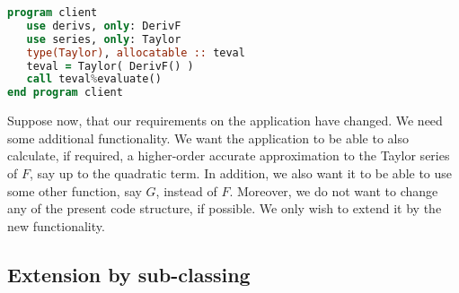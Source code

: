\documentclass[11pt,oneside]{article}
\begin{document}
\newpage

\begin{lstlisting}[language=Fortran]
program client
   use derivs, only: DerivF
   use series, only: Taylor
   type(Taylor), allocatable :: teval
   teval = Taylor( DerivF() )   
   call teval%evaluate()   
end program client
\end{lstlisting}

Suppose now, that our requirements on the application have changed.
We need some additional functionality. We want the application to be
able to also calculate, if required, a higher-order accurate
approximation to the Taylor series of $F$, say up to the quadratic
term. In addition, we also want it to be able to use some other
function, say $G$, instead of $F$. Moreover, we do not want to change
any of the present code structure, if possible. We only wish to extend
it by the new functionality.


\subsection{Extension by sub-classing}
\label{sect:sub-classing-example}
\end{document}
